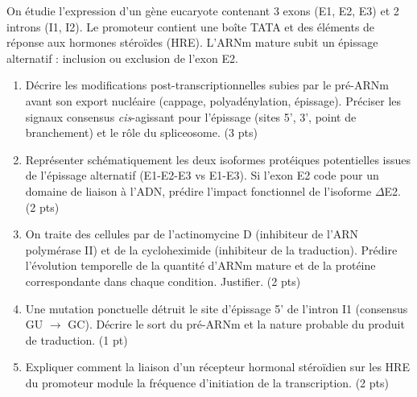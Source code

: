\documentclass[11pt]{article}
\begin{document}
\begin{exercice}
On étudie l'expression d'un gène eucaryote contenant 3 exons (E1, E2, E3) et 2 introns (I1, I2). Le promoteur contient une boîte TATA et des éléments de réponse aux hormones stéroïdes (HRE). L'ARNm mature subit un épissage alternatif : inclusion ou exclusion de l'exon E2.

\begin{enumerate}
    \item Décrire les modifications post-transcriptionnelles subies par le pré-ARNm avant son export nucléaire (cappage, polyadénylation, épissage). Préciser les signaux consensus \textit{cis}-agissant pour l'épissage (sites 5', 3', point de branchement) et le rôle du spliceosome. (3 pts)
    \item Représenter schématiquement les deux isoformes protéiques potentielles issues de l'épissage alternatif (E1-E2-E3 vs E1-E3). Si l'exon E2 code pour un domaine de liaison à l'ADN, prédire l'impact fonctionnel de l'isoforme $\Delta$E2. (2 pts)
    \item On traite des cellules par de l'actinomycine D (inhibiteur de l'ARN polymérase II) et de la cycloheximide (inhibiteur de la traduction). Prédire l'évolution temporelle de la quantité d'ARNm mature et de la protéine correspondante dans chaque condition. Justifier. (2 pts)
    \item Une mutation ponctuelle détruit le site d'épissage 5' de l'intron I1 (consensus GU $\rightarrow$ GC). Décrire le sort du pré-ARNm et la nature probable du produit de traduction. (1 pt)
    \item Expliquer comment la liaison d'un récepteur hormonal stéroïdien sur les HRE du promoteur module la fréquence d'initiation de la transcription. (2 pts)
\end{enumerate}
\end{exercice}
\end{document}
